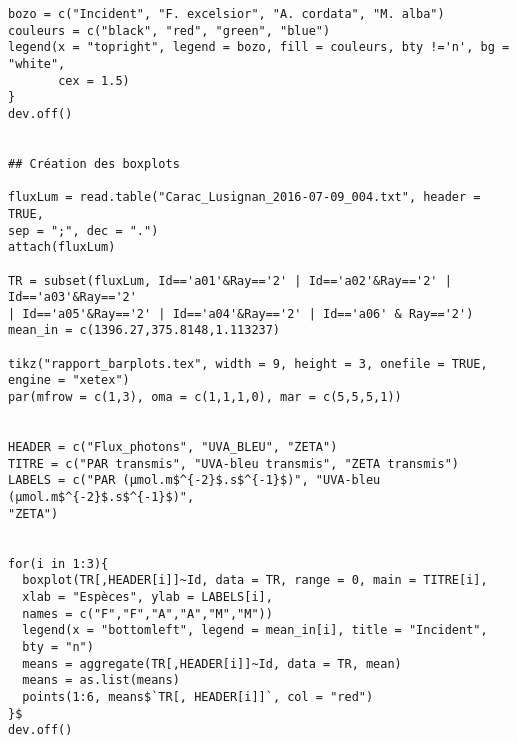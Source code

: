\documentclass[12pt]{report}
\begin{document}
\begin{verbatim}
bozo = c("Incident", "F. excelsior", "A. cordata", "M. alba")
couleurs = c("black", "red", "green", "blue")
legend(x = "topright", legend = bozo, fill = couleurs, bty !='n', bg = "white",
       cex = 1.5)
}
dev.off()


## Création des boxplots

fluxLum = read.table("Carac_Lusignan_2016-07-09_004.txt", header = TRUE,
sep = ";", dec = ".")
attach(fluxLum)

TR = subset(fluxLum, Id=='a01'&Ray=='2' | Id=='a02'&Ray=='2' | Id=='a03'&Ray=='2'
| Id=='a05'&Ray=='2' | Id=='a04'&Ray=='2' | Id=='a06' & Ray=='2')
mean_in = c(1396.27,375.8148,1.113237)

tikz("rapport_barplots.tex", width = 9, height = 3, onefile = TRUE,
engine = "xetex")
par(mfrow = c(1,3), oma = c(1,1,1,0), mar = c(5,5,5,1))


HEADER = c("Flux_photons", "UVA_BLEU", "ZETA")
TITRE = c("PAR transmis", "UVA-bleu transmis", "ZETA transmis")
LABELS = c("PAR (µmol.m$^{-2}$.s$^{-1}$)", "UVA-bleu (µmol.m$^{-2}$.s$^{-1}$)",
"ZETA")


for(i in 1:3){
  boxplot(TR[,HEADER[i]]~Id, data = TR, range = 0, main = TITRE[i],
  xlab = "Espèces", ylab = LABELS[i],
  names = c("F","F","A","A","M","M"))
  legend(x = "bottomleft", legend = mean_in[i], title = "Incident",
  bty = "n")
  means = aggregate(TR[,HEADER[i]]~Id, data = TR, mean)
  means = as.list(means)
  points(1:6, means$`TR[, HEADER[i]]`, col = "red")
}$
dev.off()
\end{verbatim}

\printindex
\end{document}
